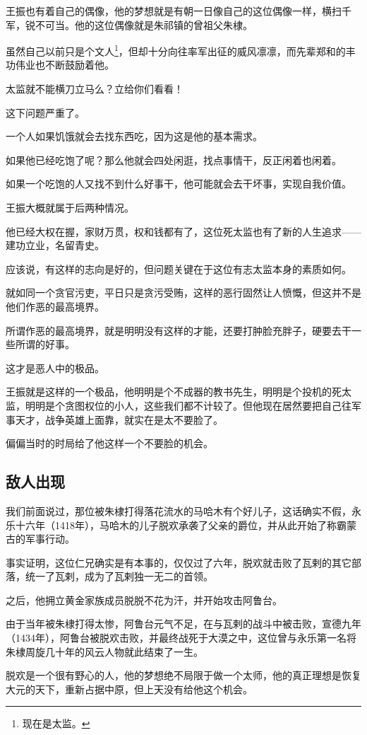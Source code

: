 \begin{multicols}{\theparacolNo}
王振也有着自己的偶像，他的梦想就是有朝一日像自己的这位偶像一样，横扫千军，锐不可当。他的这位偶像就是朱祁镇的曾祖父朱棣。

虽然自己以前只是个文人\footnote{现在是太监。}，但却十分向往率军出征的威风凛凛，而先辈郑和的丰功伟业也不断鼓励着他。

太监就不能横刀立马么？立给你们看看！

这下问题严重了。

一个人如果饥饿就会去找东西吃，因为这是他的基本需求。

如果他已经吃饱了呢？那么他就会四处闲逛，找点事情干，反正闲着也闲着。

如果一个吃饱的人又找不到什么好事干，他可能就会去干坏事，实现自我价值。

王振大概就属于后两种情况。

他已经大权在握，家财万贯，权和钱都有了，这位死太监也有了新的人生追求——建功立业，名留青史。

应该说，有这样的志向是好的，但问题关键在于这位有志太监本身的素质如何。

就如同一个贪官污吏，平日只是贪污受贿，这样的恶行固然让人愤慨，但这并不是他们作恶的最高境界。

所谓作恶的最高境界，就是明明没有这样的才能，还要打肿脸充胖子，硬要去干一些所谓的好事。

这才是恶人中的极品。

王振就是这样的一个极品，他明明是个不成器的教书先生，明明是个投机的死太监，明明是个贪图权位的小人，这些我们都不计较了。但他现在居然要把自己往军事天才，战争英雄上面靠，就实在是太不要脸了。

偏偏当时的时局给了他这样一个不要脸的机会。

\subsection{敌人出现}
我们前面说过，那位被朱棣打得落花流水的马哈木有个好儿子，这话确实不假，永乐十六年（1418年），马哈木的儿子脱欢承袭了父亲的爵位，并从此开始了称霸蒙古的军事行动。

事实证明，这位仁兄确实是有本事的，仅仅过了六年，脱欢就击败了瓦剌的其它部落，统一了瓦剌，成为了瓦剌独一无二的首领。

之后，他拥立黄金家族成员脱脱不花为汗，并开始攻击阿鲁台。

由于当年被朱棣打得太惨，阿鲁台元气不足，在与瓦剌的战斗中被击败，宣德九年（1434年），阿鲁台被脱欢击败，并最终战死于大漠之中，这位曾与永乐第一名将朱棣周旋几十年的风云人物就此结束了一生。

脱欢是一个很有野心的人，他的梦想绝不局限于做一个太师，他的真正理想是恢复大元的天下，重新占据中原，但上天没有给他这个机会。


\end{multicols}
